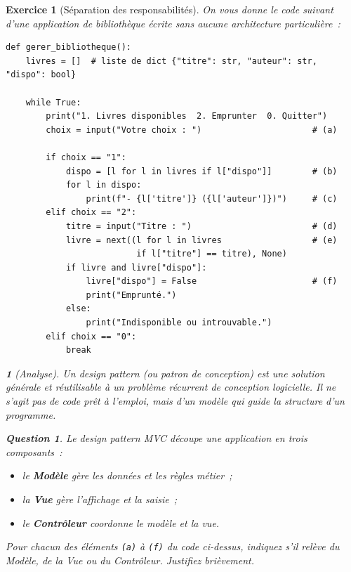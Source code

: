 \documentclass{article}
\theoremstyle{exostyle}
\newtheorem{exo}{Exercice}
\theoremstyle{partiestyle}
\newtheorem{partie}{}[exo]
\theoremstyle{questionstyle}
\newtheorem{questionpartie}{Question}[partie]
\begin{document}
\begin{exo}[Séparation des responsabilités]

On vous donne le code suivant d'une application de bibliothèque écrite sans aucune architecture particulière~:

\begin{lstlisting}
def gerer_bibliotheque():
    livres = []  # liste de dict {"titre": str, "auteur": str, "dispo": bool}

    while True:
        print("1. Livres disponibles  2. Emprunter  0. Quitter")
        choix = input("Votre choix : ")                      # (a)

        if choix == "1":
            dispo = [l for l in livres if l["dispo"]]        # (b)
            for l in dispo:
                print(f"- {l['titre']} ({l['auteur']})")     # (c)
        elif choix == "2":
            titre = input("Titre : ")                        # (d)
            livre = next((l for l in livres                  # (e)
                          if l["titre"] == titre), None)
            if livre and livre["dispo"]:
                livre["dispo"] = False                       # (f)
                print("Emprunté.")
            else:
                print("Indisponible ou introuvable.")
        elif choix == "0":
            break
\end{lstlisting}

    \begin{partie}[Analyse]

        Un \textit{design pattern} (ou patron de conception) est une solution générale et réutilisable à un problème récurrent de conception logicielle. Il ne s'agit pas de code prêt à l'emploi, mais d'un modèle qui guide la structure d'un programme.

        \begin{questionpartie}
            Le \textit{design pattern} MVC découpe une application en trois composants~:
            \begin{itemize}
                \item le \textbf{Modèle} gère les données et les règles métier~;
                \item la \textbf{Vue} gère l'affichage et la saisie~;
                \item le \textbf{Contrôleur} coordonne le modèle et la vue.
            \end{itemize}
            Pour chacun des éléments \texttt{(a)} à \texttt{(f)} du code ci-dessus, indiquez s'il relève du Modèle, de la Vue ou du Contrôleur. Justifiez brièvement.
        \end{questionpartie}


\end{partie}
\end{exo}
\end{document}
